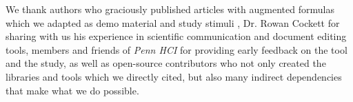 We thank authors who graciously published articles with augmented formulas which we adapted as demo material and study stimuli \cite[Mohammed et al., Murad, Azad, Cockett \& Heagy, Hohman et al.]{mohammed2020continuous,ref:murad2020navierstokes,W4,ref:cockett2016pixels,ref:hohman2019gamut}, Dr. Rowan Cockett for sharing with us his experience in scientific communication and document editing tools, members and friends of \textit{Penn HCI} for providing early feedback on the tool and the study, as well as open-source contributors who not only created the libraries and tools which we directly cited, but also many indirect dependencies that make what we do possible.
